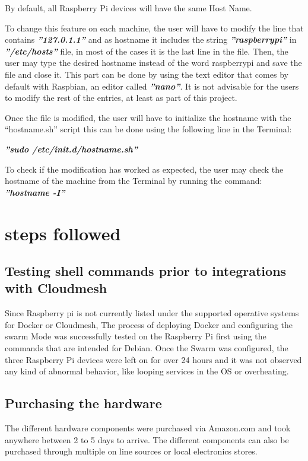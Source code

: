 	By default, all Raspberry Pi devices will have the same Host Name.
	
	To change this feature on each machine, the user will have to modify the line that contains \textbf{\textit{''127.0.1.1''}}  and as hostname it includes the string \textbf{\textit{''raspberrypi''}} in \textbf{\textit{''/etc/hosts''}} file, in most of the cases it is the last line in the file. Then, the user may type the desired hostname instead of the word raspberrypi and save the file and close it. This part can be done by using the text editor that comes by default with Raspbian, an editor called \textbf{\textit{''nano''}}.
	It is not advisable for the users to modify the rest of the entries, at least as part of this project.
	
	Once the file is modified, the user will have to initialize 
  the hostname with the “hostname.sh” script this can be done
  using the following line in the Terminal:
  
  \textbf{\textit{''sudo /etc/init.d/hostname.sh''}}
	
	To check if the modification has worked  as expected, the user may
  check the hostname of the machine from the Terminal by 
  running the command:
  \textbf{\textit{''hostname -I''}}
	
	\section{steps followed}
		
	\subsection{Testing shell commands prior to integrations with Cloudmesh}
	
Since Raspberry pi is not currently listed under the supported 
operative systems for Docker or Cloudmesh, The process of deploying
Docker and configuring the swarm Mode was successfully tested on the
Raspberry Pi first using the commands that are intended for Debian.
Once the Swarm was configured, the three Raspberry Pi devices were 
left on for over 24 hours and it was not observed any kind of abnormal 
behavior, like looping services in the OS or overheating.
		
	\subsection{Purchasing the hardware}
	
	The different hardware components were purchased
  via Amazon.com and took anywhere between 2 to 5 days 
  to arrive. The different components can also be purchased 
  through multiple on line sources or local electronics stores.
		
